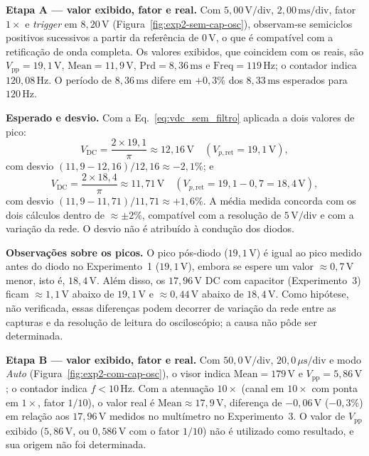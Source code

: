 \textbf{Etapa A --- valor exibido, fator e real.} Com $5{,}00\,\text{V/div}$, $2{,}00\,\text{ms/div}$, fator $1\times$ e \textit{trigger} em $8{,}20\,\text{V}$ (Figura~\ref{fig:exp2-sem-cap-osc}), observam-se semiciclos positivos sucessivos a partir da referência de $0\,\text{V}$, o que é compatível com a retificação de onda completa. Os valores exibidos, que coincidem com os reais, são $V_{\text{pp}} = 19{,}1\,\text{V}$, $\text{Mean} = 11{,}9\,\text{V}$, $\text{Prd} = 8{,}36\,\text{ms}$ e $\text{Freq} = 119\,\text{Hz}$; o contador indica $120{,}08\,\text{Hz}$. O período de $8{,}36\,\text{ms}$ difere em $+0{,}3\%$ dos $8{,}33\,\text{ms}$ esperados para $120\,\text{Hz}$.

\textbf{Esperado e desvio.} Com a Eq.~\eqref{eq:vdc_sem_filtro} aplicada a dois valores de pico:
\begin{equation}
V_{\text{DC}} = \frac{2 \times 19{,}1}{\pi} \approx 12{,}16\,\text{V} \quad (V_{p,\text{ret}} = 19{,}1\,\text{V}),
\end{equation}
com desvio $(11{,}9 - 12{,}16)/12{,}16 \approx -2{,}1\%$; e
\begin{equation}
V_{\text{DC}} = \frac{2 \times 18{,}4}{\pi} \approx 11{,}71\,\text{V} \quad (V_{p,\text{ret}} = 19{,}1 - 0{,}7 = 18{,}4\,\text{V}),
\end{equation}
com desvio $(11{,}9 - 11{,}71)/11{,}71 \approx +1{,}6\%$. A média medida concorda com os dois cálculos dentro de $\approx \pm 2\%$, compatível com a resolução de $5\,\text{V/div}$ e com a variação da rede. O desvio não é atribuído à condução dos diodos.

\textbf{Observações sobre os picos.} O pico pós-diodo ($19{,}1\,\text{V}$) é igual ao pico medido antes do diodo no Experimento~1 ($19{,}1\,\text{V}$), embora se espere um valor $\approx 0{,}7\,\text{V}$ menor, isto é, $18{,}4\,\text{V}$. Além disso, os $17{,}96\,\text{V}$ DC com capacitor (Experimento~3) ficam $\approx 1{,}1\,\text{V}$ abaixo de $19{,}1\,\text{V}$ e $\approx 0{,}44\,\text{V}$ abaixo de $18{,}4\,\text{V}$. Como hipótese, não verificada, essas diferenças podem decorrer de variação da rede entre as capturas e da resolução de leitura do osciloscópio; a causa não pôde ser determinada.

\textbf{Etapa B --- valor exibido, fator e real.} Com $50{,}0\,\text{V/div}$, $20{,}0\,\mu\text{s/div}$ e modo \textit{Auto} (Figura~\ref{fig:exp2-com-cap-osc}), o visor indica $\text{Mean} = 179\,\text{V}$ e $V_{\text{pp}} = 5{,}86\,\text{V}$; o contador indica $f < 10\,\text{Hz}$. Com a atenuação $10\times$ (canal em $10\times$ com ponta em $1\times$, fator $1/10$), o valor real é $\text{Mean} \approx 17{,}9\,\text{V}$, diferença de $-0{,}06\,\text{V}$ ($-0{,}3\%$) em relação aos $17{,}96\,\text{V}$ medidos no multímetro no Experimento~3. O valor de $V_{\text{pp}}$ exibido ($5{,}86\,\text{V}$, ou $0{,}586\,\text{V}$ com o fator $1/10$) não é utilizado como resultado, e sua origem não foi determinada.

